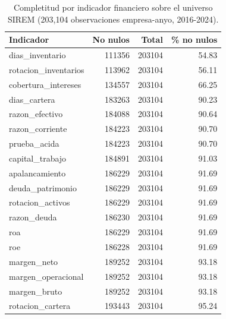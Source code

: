 \begin{table}
\caption{Completitud por indicador financiero sobre el universo SIREM (203,104 observaciones empresa-anyo, 2016-2024).}
\label{tab:completitud_indicadores}
\begin{tabular}{lrrr}
\toprule
Indicador & No nulos & Total & \% no nulos \\
\midrule
dias_inventario & 111356 & 203104 & 54.83 \\
rotacion_inventarios & 113962 & 203104 & 56.11 \\
cobertura_intereses & 134557 & 203104 & 66.25 \\
dias_cartera & 183263 & 203104 & 90.23 \\
razon_efectivo & 184088 & 203104 & 90.64 \\
razon_corriente & 184223 & 203104 & 90.70 \\
prueba_acida & 184223 & 203104 & 90.70 \\
capital_trabajo & 184891 & 203104 & 91.03 \\
apalancamiento & 186229 & 203104 & 91.69 \\
deuda_patrimonio & 186229 & 203104 & 91.69 \\
rotacion_activos & 186229 & 203104 & 91.69 \\
razon_deuda & 186230 & 203104 & 91.69 \\
roa & 186229 & 203104 & 91.69 \\
roe & 186228 & 203104 & 91.69 \\
margen_neto & 189252 & 203104 & 93.18 \\
margen_operacional & 189252 & 203104 & 93.18 \\
margen_bruto & 189252 & 203104 & 93.18 \\
rotacion_cartera & 193443 & 203104 & 95.24 \\
\bottomrule
\end{tabular}
\end{table}
